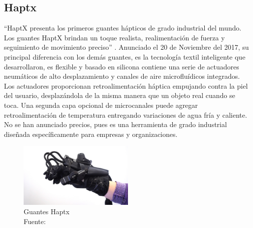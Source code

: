 \subsection{Haptx}

``HaptX presenta los primeros guantes hápticos de grado industrial del mundo. Los guantes HaptX brindan un toque realista, realimentación de fuerza y seguimiento de movimiento preciso'' \cite{haptx-info-page}. %
Anunciado el 20 de Noviembre del 2017, su principal diferencia con los demás guantes, es la tecnología textil inteligente que desarrollaron, es flexible y basado en silicona contiene una serie de actuadores neumáticos de alto desplazamiento y canales de aire microfluídicos integrados. Los actuadores proporcionan retroalimentación háptica empujando contra la piel del usuario, desplazándola de la misma manera que un objeto real cuando se toca. Una segunda capa opcional de microcanales puede agregar retroalimentación de temperatura entregando variaciones de agua fría y caliente. No se han anunciado precios, pues es una herramienta de grado industrial diseñada específicamente para empresas y organizaciones.

\begin{figure}[H]
  \begin{center} 
   	\includegraphics[width=0.5\textwidth]{images/chapter02/haptx01.jpg} 
    \caption[Guantes Haptx]{Guantes Haptx \\Fuente: \cite{haptx-info-page}} 
    \label{fig:haptx}
  \end{center}
\end{figure}




